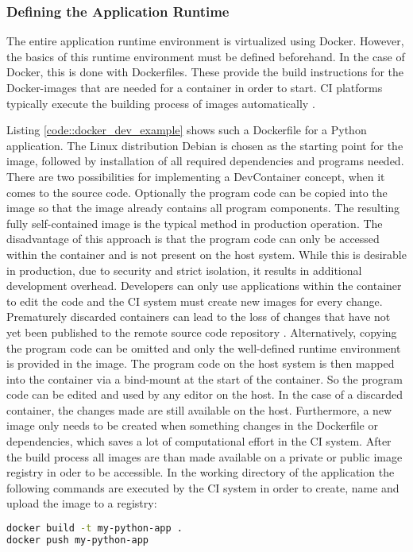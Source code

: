         \subsubsection{Defining the Application Runtime}
        The entire application runtime environment is virtualized using Docker. However, the basics of this runtime environment must be defined beforehand. In the case of Docker, this is done with Dockerfiles. These provide the build instructions for the Docker-images that are needed for a container in order to start. \ac{CI} platforms typically execute the building process of images automatically \cite{docker2020}.\newline
        
        Listing \ref{code::docker_dev_example} shows such a Dockerfile for a Python application. The Linux distribution Debian is chosen as the starting point for the image, followed by installation of all required dependencies and programs needed. There are two possibilities for implementing a DevContainer concept, when it comes to the source code. Optionally the program code can be copied into the image so that the image already contains all program components. The resulting fully self-contained image is the typical method in production operation. The disadvantage of this approach is that the program code can only be accessed within the container and is not present on the host system. While this is desirable in production, due to security and strict isolation, it results in additional development overhead. Developers can only use applications within the container to edit the code and the \ac{CI} system must create new images for every change. Prematurely discarded containers can lead to the loss of changes that have not yet been published to the remote source code repository \cite{dockerdocs}.\newline
        Alternatively, copying the program code can be omitted and only the well-defined runtime environment is provided in the image. The program code on the host system is then mapped into the container via a bind-mount at the start of the container. So the program code can be edited and used by any editor on the host. In the case of a discarded container, the changes made are still available on the host. Furthermore, a new image only needs to be created when something changes in the Dockerfile or dependencies, which saves a lot of computational effort in the \ac{CI} system. After the build process all images are than made available on a private or public image registry in oder to be accessible. In the working directory of the application the following commands are executed by the \ac{CI} system in order to create, name and upload the image to a registry:
        \begin{lstlisting}[language=bash, frame=none, numbers=none, backgroundcolor=\color{codebg}]
docker build -t my-python-app .
docker push my-python-app
        \end{lstlisting}
        \vspace{-1cm}

